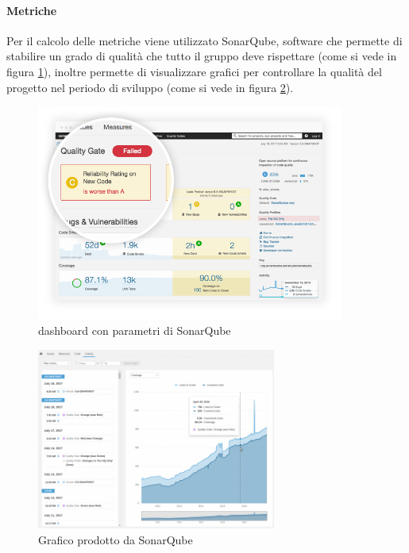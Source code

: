 			\paragraph{Metriche} \Spazio
			Per il calcolo delle metriche viene utilizzato SonarQube, software che permette di stabilire un grado di qualità che tutto il gruppo deve rispettare (come si vede in figura \ref{qualità}), inoltre permette di visualizzare grafici per controllare la qualità del progetto nel periodo di sviluppo (come si vede in figura \ref{graficobello}).
			\begin{figure}[h] 
				\centering 
				\includegraphics[width=0.9\textwidth]{images/enforce-quality-gate.png} 
				\caption{dashboard con parametri di SonarQube}
				\label{qualità}
			\end{figure}
		    \begin{figure}[h]
		    	\centering 
		    	\includegraphics[width=0.7\textwidth]{images/project-history2.png}
		    	\caption{Grafico prodotto da SonarQube}
		    	\label{graficobello} 
		    \end{figure}
			